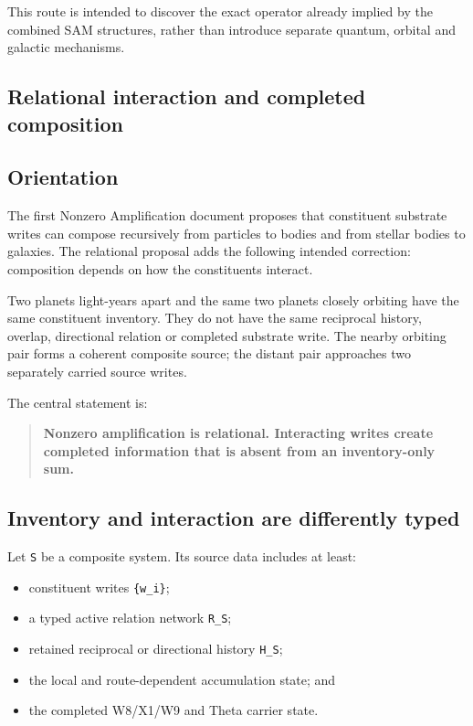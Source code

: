 This route is intended to discover the exact operator already implied by
the combined SAM structures, rather than introduce separate quantum,
orbital and galactic mechanisms.

\subsection{Relational interaction and completed
composition}\label{viii-ch12-relational-interaction-and-completed-composition}

\subsection{Orientation}\label{viii-ch12-orientation-1}

The first Nonzero Amplification document proposes that constituent
substrate writes can compose recursively from particles to bodies and
from stellar bodies to galaxies. The relational proposal adds the
following intended correction: composition depends on how the
constituents interact.

Two planets light-years apart and the same two planets closely orbiting
have the same constituent inventory. They do not have the same
reciprocal history, overlap, directional relation or completed substrate
write. The nearby orbiting pair forms a coherent composite source; the
distant pair approaches two separately carried source writes.

The central statement is:

\begin{quote}
\textbf{Nonzero amplification is relational. Interacting writes create
completed information that is absent from an inventory-only sum.}
\end{quote}

\subsection{Inventory and interaction are differently
typed}\label{viii-ch12-inventory-and-interaction-are-differently-typed}

Let \texttt{S} be a composite system. Its source data includes at least:

\begin{itemize}
\tightlist
\item
  constituent writes \texttt{\{w\_i\}};
\item
  a typed active relation network \texttt{R\_S};
\item
  retained reciprocal or directional history \texttt{H\_S};
\item
  the local and route-dependent accumulation state; and
\item
  the completed W8/X1/W9 and Theta carrier state.
\end{itemize}

